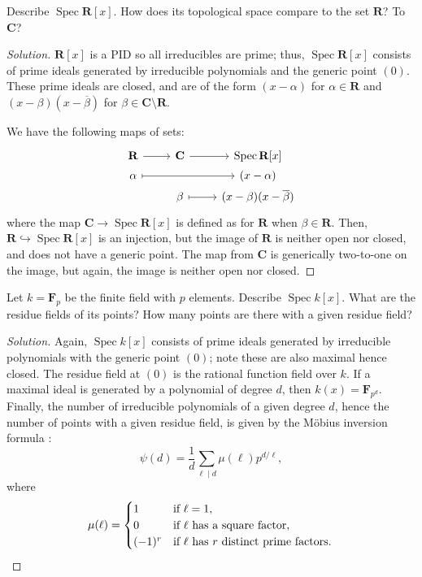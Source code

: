 \documentclass[10pt]{article}
\theoremstyle{definition}
\theoremstyle{remark}
\numberwithin{equation}{section}
\numberwithin{figure}{subsubsection}
\DeclareMathOperator{\Spec}{Spec}
\begin{document}
\begin{problem}
  Describe $\Spec \mathbf{R}[x]$. How does its topological space compare to the set $\mathbf{R}$? To $\mathbf{C}$?
\end{problem}
\begin{proof}[Solution]
  $\mathbf{R}[x]$ is a PID so all irreducibles are prime; thus, $\Spec \mathbf{R}[x]$ consists of prime ideals generated by irreducible polynomials and the generic point $(0)$. These prime ideals are closed, and are of the form $(x-\alpha)$ for $\alpha \in \mathbf{R}$ and $(x-\beta)(x-\overline{\beta})$ for $\beta \in \mathbf{C} \setminus \mathbf{R}$.
  \par We have the following maps of sets:
  \begin{equation*}
    \begin{tikzcd}[row sep=0em]
      \mathbf{R} \rar & \mathbf{C} \rar & \Spec\mathbf{R}[x]\\
      \alpha \arrow[mapsto]{rr} & & (x-\alpha)\\
      & \beta \arrow[mapsto]{r} & (x-\beta)(x-\overline{\beta})
    \end{tikzcd}
  \end{equation*}
  where the map $\mathbf{C} \to \Spec\mathbf{R}[x]$ is defined as for $\mathbf{R}$ when $\beta \in \mathbf{R}$. Then, $\mathbf{R} \hookrightarrow \Spec \mathbf{R}[x]$ is an injection, but the image of $\mathbf{R}$ is neither open nor closed, and does not have a generic point. The map from $\mathbf{C}$ is generically two-to-one on the image, but again, the image is neither open nor closed.
\end{proof}

\begin{problem}
  Let $k = \mathbf{F}_p$ be the finite field with $p$ elements. Describe $\Spec k[x]$. What are the residue fields of its points? How many points are there with a given residue field?
\end{problem}
\begin{proof}[Solution]
  Again, $\Spec k[x]$ consists of prime ideals generated by irreducible polynomials with the generic point $(0)$; note these are also maximal hence closed. The residue field at $(0)$ is the rational function field over $k$. If a maximal ideal is generated by a polynomial of degree $d$, then $k(x) = \mathbf{F}_{p^d}$. Finally, the number of irreducible polynomials of a given degree $d$, hence the number of points with a given residue field, is given by the M\"obius inversion formula \cite[p.~588]{DF04}:
  \begin{equation*}
    \psi(d) = \frac{1}{d} \sum_{\ell \mid d} \mu(\ell)p^{d/\ell},
  \end{equation*}
  where
  \begin{equation*}
    \mu(\ell) = \begin{cases}
      1 & \text{if}~\ell = 1,\\
      0 & \text{if $\ell$ has a square factor},\\
      (-1)^r & \text{if $\ell$ has $r$ distinct prime factors}.
    \end{cases}\qedhere
  \end{equation*}
\end{proof}
\end{document}

